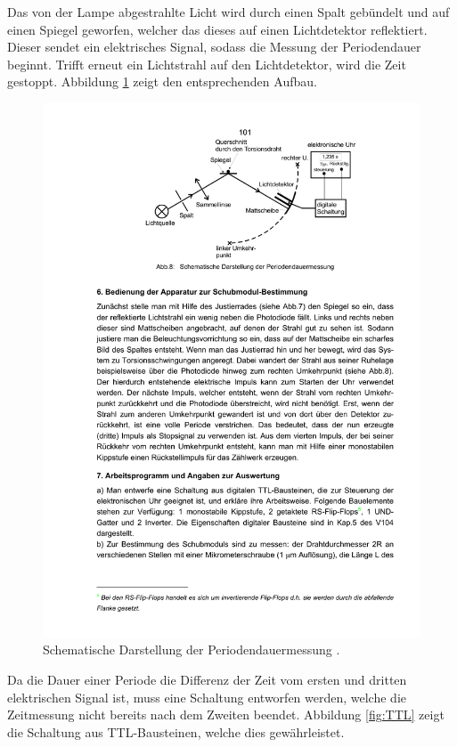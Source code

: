 Das von der Lampe abgestrahlte Licht wird durch einen Spalt gebündelt und auf einen Spiegel geworfen, welcher das dieses auf einen Lichtdetektor reflektiert. Dieser sendet ein elektrisches Signal, sodass die Messung der Periodendauer beginnt. Trifft erneut ein Lichtstrahl auf den Lichtdetektor, wird die Zeit gestoppt. Abbildung \ref{fig:schematisch} zeigt den entsprechenden Aufbau.

\begin{figure}
  \centering
  \includegraphics[scale=0.7]{bilder/messapparatur-schematisch.pdf}
\caption{Schematische Darstellung der Periodendauermessung \cite{anleitung102}.}
  \label{fig:schematisch}
\end{figure}

Da die Dauer einer Periode die Differenz der Zeit vom ersten und dritten elektrischen Signal ist, muss eine Schaltung entworfen werden, welche die Zeitmessung nicht bereits nach dem Zweiten beendet. Abbildung \ref{fig:TTL} zeigt die Schaltung aus TTL-Bausteinen, welche dies gewährleistet.

